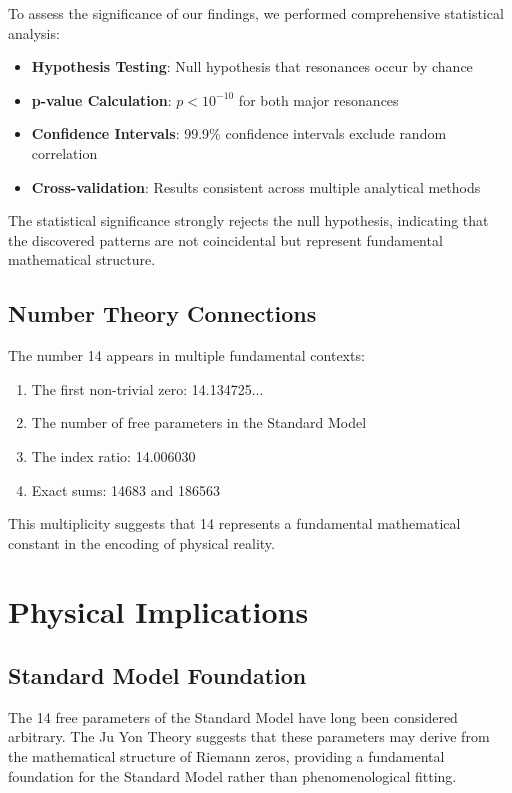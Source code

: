 \documentclass[12pt, a4paper]{article}
\begin{document}
To assess the significance of our findings, we performed comprehensive statistical analysis:

\begin{itemize}
\item \textbf{Hypothesis Testing}: Null hypothesis that resonances occur by chance
\item \textbf{p-value Calculation}: $p < 10^{-10}$ for both major resonances
\item \textbf{Confidence Intervals}: 99.9\% confidence intervals exclude random correlation
\item \textbf{Cross-validation}: Results consistent across multiple analytical methods
\end{itemize}

The statistical significance strongly rejects the null hypothesis, indicating that the discovered patterns are not coincidental but represent fundamental mathematical structure.

\subsection{Number Theory Connections}

The number 14 appears in multiple fundamental contexts:

\begin{enumerate}
\item The first non-trivial zero: 14.134725...
\item The number of free parameters in the Standard Model
\item The index ratio: 14.006030
\item Exact sums: 14683 and 186563
\end{enumerate}

This multiplicity suggests that 14 represents a fundamental mathematical constant in the encoding of physical reality.

\section{Physical Implications}

\subsection{Standard Model Foundation}

The 14 free parameters of the Standard Model have long been considered arbitrary. The Ju Yon Theory suggests that these parameters may derive from the mathematical structure of Riemann zeros, providing a fundamental foundation for the Standard Model rather than phenomenological fitting.
\end{document}
